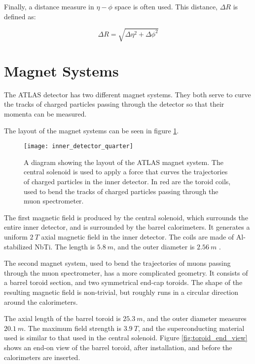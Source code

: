 Finally, a distance measure in $\eta-\phi$ space is often used. This
distance, $\Delta R$ is defined as:

\begin{equation}
\Delta R = \sqrt{\Delta\eta^2+\Delta\phi^2}
\end{equation}

\section{Magnet Systems}
The ATLAS detector has two different magnet systems. They both serve
to curve the tracks of charged particles passing through the detector
so that their momenta can be measured.

The layout of the magnet systems can be seen in figure \ref{fig:magnet_layout}.

\begin{figure}[h]
\texttt{[image: inner\_detector\_quarter]}
\caption{A diagram showing the layout of the ATLAS magnet system. The
  central solenoid is used to apply a force that curves the
  trajectories of charged particles in the inner detector. In red are
  the toroid coils, used to bend the tracks of charged particles
  passing through the muon spectrometer.}
\label{fig:magnet_layout}
\end{figure}

The first magnetic field is produced by the central solenoid, which surrounds
the entire inner detector, and is surrounded by the barrel calorimeters. It
generates a uniform $2~T$ axial magnetic field in the inner
detector. The coils are made of Al-stabilized NbTi. The length is
$5.8~m$, and the outer diameter is $2.56~m$
\cite{ref:atlas-detector-2008}.

The second magnet system, used to bend the trajectories of muons
passing through the muon spectrometer, has a more complicated
geometry. It consists of a barrel toroid section, and two symmetrical
end-cap toroids. The shape of the resulting magnetic field is
non-trivial, but roughly runs in a circular direction around the
calorimeters.

The axial length of the barrel toroid is $25.3~m$, and the outer
diameter measures $20.1~m$. The maximum field strength is $3.9~T$, and
the superconducting material used is similar to that used in the
central solenoid\cite{ref:atlas-detector-2008}. Figure \ref{fig:toroid_end_view} shows an
end-on view of the barrel toroid, after installation, and before the calorimeters are
inserted.


